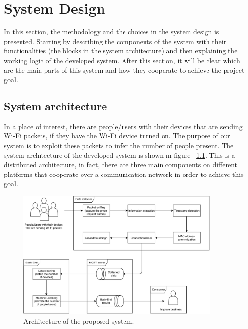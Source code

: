 \chapter{System Design}
\label{cha:system}
\vspace{0.4 cm} 

In this section, the methodology and the choices in the system design is presented. Starting by describing the components of the system with their functionalities (the blocks in the system architecture) and then explaining the working logic of the developed system. After this section, it will be clear which are the main parts of this system and how they cooperate to achieve the project goal.


\section{System architecture}
\label{sec:sysarc}
\vspace{0.2 cm} 

In a place of interest, there are people/users with their devices that are sending Wi-Fi packets, if they have the Wi-Fi device turned on. The purpose of our system is to exploit these packets to infer the number of people present. The system architecture of the developed system is shown in figure ~\ref{fig:architecture}. 
This is a distributed architecture, in fact, there are three main components on different platforms that cooperate over a communication network in order to achieve this goal.

\begin{figure}[h]
\centering 
\includegraphics[width=0.9\textwidth]{images/architecture} 
\caption{Architecture of the proposed system.}
\label{fig:architecture}
\end{figure}

